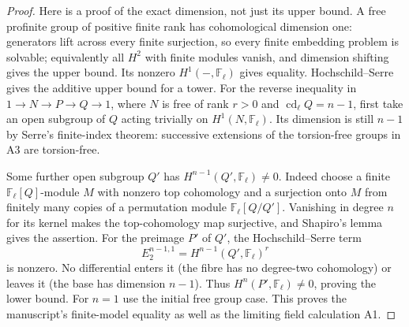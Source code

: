 \begin{proof}
Here is a proof of the exact dimension, not just its upper bound.
A free profinite group of positive finite rank has cohomological
dimension one: generators lift across every finite surjection,
so every finite embedding problem is solvable; equivalently all
$H^2$ with finite modules vanish, and dimension shifting gives the
upper bound. Its nonzero $H^1(-,\mathbb F_\ell)$ gives equality.
Hochschild--Serre gives the additive upper bound for a tower.
For the reverse inequality in $1\to N\to P\to Q\to1$, where
$N$ is free of rank $r>0$ and $\operatorname{cd}_\ell Q=n-1$,
first take an open subgroup of $Q$ acting trivially on
$H^1(N,\mathbb F_\ell)$. Its dimension is still $n-1$ by Serre's
finite-index theorem: successive extensions of the torsion-free
groups in A3 are torsion-free.

Some further open subgroup $Q'$ has
$H^{n-1}(Q',\mathbb F_\ell)\ne0$. Indeed choose a finite
$\mathbb F_\ell[Q]$-module $M$ with nonzero top cohomology and a
surjection onto $M$ from finitely many copies of a permutation
module $\mathbb F_\ell[Q/Q']$. Vanishing in degree $n$ for its
kernel makes the top-cohomology map surjective, and Shapiro's
lemma gives the assertion. For the preimage $P'$ of $Q'$, the
Hochschild--Serre term
\[
 E_2^{n-1,1}=H^{n-1}(Q',\mathbb F_\ell)^{r}
\]
is nonzero. No differential enters it (the fibre has no degree-two
cohomology) or leaves it (the base has dimension $n-1$).
Thus $H^n(P',\mathbb F_\ell)\ne0$, proving the lower bound.
For $n=1$ use the initial free group case. This proves the
manuscript's finite-model equality as well as the limiting field
calculation A1.
\end{proof}

